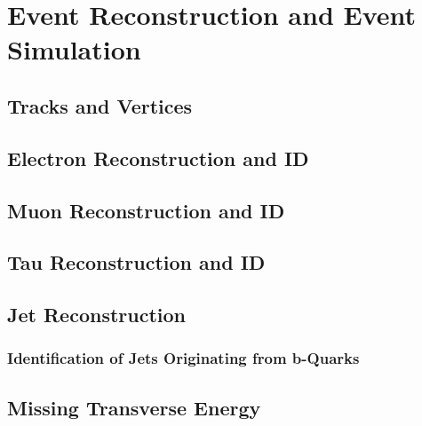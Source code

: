 \documentclass[oneside, letterpaper, 12pt, oldfontcommands]{memoir}
\begin{document}
\chapter{Event Reconstruction and Event Simulation}
 \section{Tracks and Vertices}
 \section{Electron Reconstruction and ID}
 \section{Muon Reconstruction and ID}
 \section{Tau Reconstruction and ID}
 \section{Jet Reconstruction}
  \subsection{Identification of Jets Originating from b-Quarks}
 \section{Missing Transverse Energy}



\end{document}
